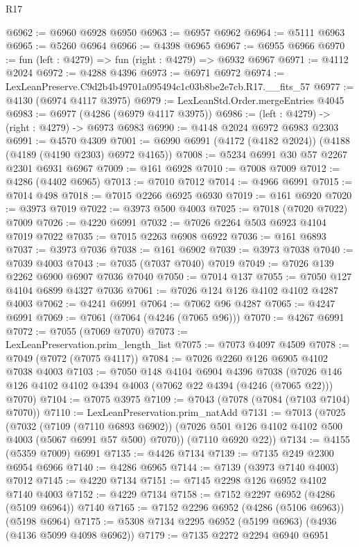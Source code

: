 \begin{lexlean}{R17}
\begin{coremodule}
@6962 := @6960 @6928 @6950
@6963 := @6957 @6962
@6964 := @5111 @6963
@6965 := @5260 @6964
@6966 := @4398 @6965
@6967 := @6955 @6966
@6970 := fun (left : @4279) => fun (right : @4279) => @6932 @6967
@6971 := @4112 @2024
@6972 := @4288 @4396
@6973 := @6971 @6972
@6974 := LexLeanPreserve.C9d2b4b49701a095494c1c03b8be2e7cb.R17.__fits_57
@6977 := @4130 (@6974 @4117 @3975)
@6979 := LexLeanStd.Order.mergeEntries @4045
@6983 := @6977 (@4286 (@6979 @4117 @3975))
@6986 := (left : @4279) -> (right : @4279) -> @6973 @6983
@6990 := @4148 @2024 @6972 @6983 @2303
@6991 := @4570 @4309
@7001 := @6990 @6991 (@4172 (@4182 @2024)) (@4188 (@4189 (@4190 @2303) @6972 @4165))
@7008 := @5234 @6991 @30 @57 @2267 @2301 @6931 @6967
@7009 := @161 @6928
@7010 := @7008 @7009
@7012 := @4286 (@4402 @6965)
@7013 := @7010 @7012
@7014 := @4966 @6991
@7015 := @7014 @498
@7018 := @7015 @2266 @6925 @6930
@7019 := @161 @6920
@7020 := @3973 @7019
@7022 := @3973 @500 @4003
@7025 := @7018 (@7020 @7022) @7009
@7026 := @4220 @6991
@7032 := @7026 @2264 @503 @6923 @4104 @7019 @7022
@7035 := @7015 @2263 @6908 @6922
@7036 := @161 @6893
@7037 := @3973 @7036
@7038 := @161 @6902
@7039 := @3973 @7038
@7040 := @7039 @4003
@7043 := @7035 (@7037 @7040) @7019
@7049 := @7026 @139 @2262 @6900 @6907 @7036 @7040
@7050 := @7014 @137
@7055 := @7050 @127 @4104 @6899 @4327 @7036
@7061 := @7026 @124 @126 @4102 @4102 @4287 @4003
@7062 := @4241 @6991
@7064 := @7062 @96 @4287
@7065 := @4247 @6991
@7069 := @7061 (@7064 (@4246 (@7065 @96)))
@7070 := @4267 @6991
@7072 := @7055 (@7069 @7070)
@7073 := LexLeanPreservation.prim_length_list
@7075 := @7073 @4097 @4509
@7078 := @7049 (@7072 (@7075 @4117))
@7084 := @7026 @2260 @126 @6905 @4102 @7038 @4003
@7103 := @7050
    @148
    @4104
    @6904
    @4396
    @7038
    (@7026 @146 @126 @4102 @4102 @4394 @4003 (@7062 @22 @4394 (@4246 (@7065 @22))) @7070)
@7104 := @7075 @3975
@7109 := @7043 (@7078 (@7084 (@7103 @7104) @7070))
@7110 := LexLeanPreservation.prim_natAdd
@7131 := @7013
    (@7025
      (@7032
        (@7109 (@7110 @6893 @6902))
        (@7026 @501 @126 @4102 @4102 @500 @4003 (@5067 @6991 @57 @500) @7070))
      (@7110 @6920 @22))
@7134 := @4155 (@5359 @7009) @6991
@7135 := @4426 @7134
@7139 := @7135 @249 @2300 @6954 @6966
@7140 := @4286 @6965
@7144 := @7139 (@3973 @7140 @4003) @7012
@7145 := @4220 @7134
@7151 := @7145 @2298 @126 @6952 @4102 @7140 @4003
@7152 := @4229 @7134
@7158 := @7152 @2297 @6952 (@4286 (@5109 @6964)) @7140
@7165 := @7152 @2296 @6952 (@4286 (@5106 @6963)) (@5198 @6964)
@7175 := @5308 @7134 @2295 @6952 (@5199 @6963) (@4936 (@4136 @5099 @4098 @6962))
@7179 := @7135 @2272 @2294 @6940 @6951

\end{coremodule}
\end{lexlean}
